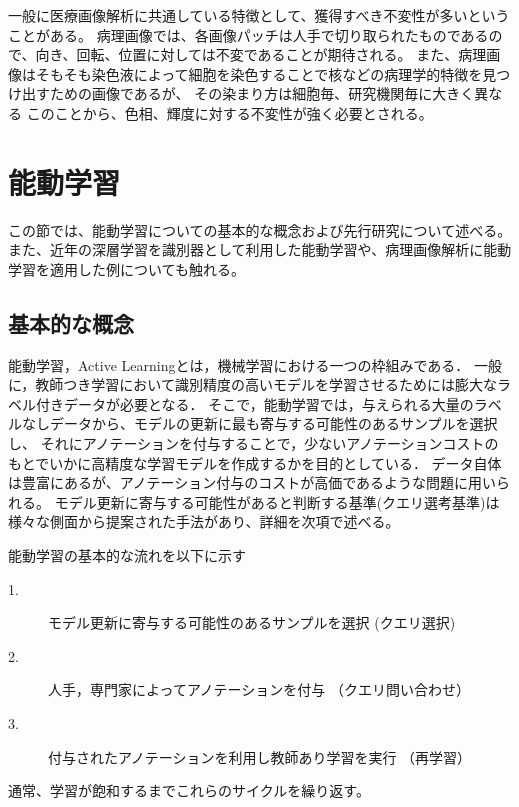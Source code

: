 一般に医療画像解析に共通している特徴として、獲得すべき不変性が多いということがある。
病理画像では、各画像パッチは人手で切り取られたものであるので、向き、回転、位置に対しては不変であることが期待される。
また、病理画像はそもそも染色液によって細胞を染色することで核などの病理学的特徴を見つけ出すための画像であるが、
その染まり方は細胞毎、研究機関毎に大きく異なる
このことから、色相、輝度に対する不変性が強く必要とされる。

\section{能動学習}

この節では、能動学習についての基本的な概念および先行研究について述べる。
また、近年の深層学習を識別器として利用した能動学習や、病理画像解析に能動学習を適用した例についても触れる。

\subsection{基本的な概念}
能動学習，Active Learning\cite{settles2010active}とは，機械学習における一つの枠組みである．
一般に，教師つき学習において識別精度の高いモデルを学習させるためには膨大なラベル付きデータが必要となる．
そこで，能動学習では，与えられる大量のラベルなしデータから、モデルの更新に最も寄与する可能性のあるサンプルを選択し、
それにアノテーションを付与することで，少ないアノテーションコストのもとでいかに高精度な学習モデルを作成するかを目的としている．
データ自体は豊富にあるが、アノテーション付与のコストが高価であるような問題に用いられる。
モデル更新に寄与する可能性があると判断する基準(クエリ選考基準)は様々な側面から提案された手法があり、詳細を次項で述べる。

能動学習の基本的な流れを以下に示す
\begin{description}
    \item[1.] モデル更新に寄与する可能性のあるサンプルを選択 (クエリ選択)
    \item[2.] 人手，専門家によってアノテーションを付与 （クエリ問い合わせ）
    \item[3.] 付与されたアノテーションを利用し教師あり学習を実行 （再学習）
\end{description}
通常、学習が飽和するまでこれらのサイクルを繰り返す。

